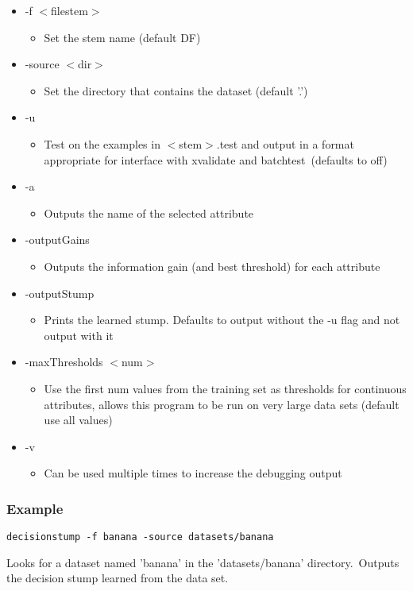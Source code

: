 \begin{itemize}
\item -f $<$filestem$>$\begin{itemize}
\item Set the stem name (default DF)\end{itemize}
\item -source $<$dir$>$\begin{itemize}
\item Set the directory that contains the dataset (default '.')\end{itemize}
\item -u\begin{itemize}
\item Test on the examples in $<$stem$>$.test and output in a format appropriate for interface with xvalidate and batchtest\  (defaults to off)\end{itemize}
\item -a\begin{itemize}
\item Outputs the name of the selected attribute\end{itemize}
\item -output\-Gains\begin{itemize}
\item Outputs the information gain (and best threshold) for each attribute\end{itemize}
\item -output\-Stump\begin{itemize}
\item Prints the learned stump. Defaults to output without the -u flag and not output with it\end{itemize}
\item -max\-Thresholds $<$num$>$\begin{itemize}
\item Use the first num values from the training set as thresholds for continuous attributes, allows this program to be run on very large data sets (default use all values)\end{itemize}
\item -v\begin{itemize}
\item Can be used multiple times to increase the debugging output\end{itemize}
\end{itemize}


\subsubsection*{Example}

{\tt decisionstump -f banana -source datasets/banana}

Looks for a dataset named 'banana' in the 'datasets/banana' directory.\  Outputs the decision stump learned from the data set.

